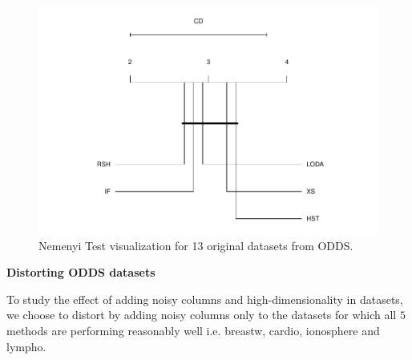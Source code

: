 \documentclass[11pt,onecolumn]{article}
\begin{document}
\begin{figure}[ht!]
    \centering
        \includegraphics[width=\linewidth]{fig/Nemenyi_ODDS_All.pdf}
        \caption{Nemenyi Test visualization for 13 original datasets from ODDS.}
    \label{fig:Nemenyi-ODDS-ALL}
\end{figure}

\textbf{Distorting ODDS datasets}

To study the effect of adding noisy columns and high-dimensionality in datasets, we choose to distort by adding noisy columns only to the datasets for which all $5$ methods are performing reasonably well i.e. breastw, cardio, ionosphere and lympho. 
\end{document}
